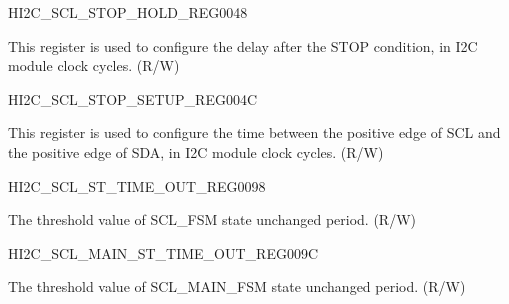 \begin{register}{H}{I2C\_SCL\_STOP\_HOLD\_REG}{\hexprefix{}0048}\label{regdesc:I2CSCLSTOPHOLDREG}
%
%
\regnewline%
\begin{regdesc}\begin{reglist}
\label{fielddesc:I2CSCLSTOPHOLDTIME}\item [I2C\_SCL\_STOP\_HOLD\_TIME] This register is used to configure the delay after the STOP condition, in I2C module clock cycles. (R/W)
\end{reglist}\end{regdesc}
\end{register}


\begin{register}{H}{I2C\_SCL\_STOP\_SETUP\_REG}{\hexprefix{}004C}\label{regdesc:I2CSCLSTOPSETUPREG}
%
%
\regnewline%
\begin{regdesc}\begin{reglist}
\label{fielddesc:I2CSCLSTOPSETUPTIME}\item [I2C\_SCL\_STOP\_SETUP\_TIME] This register is used to configure the time between the positive edge of SCL and the positive edge of SDA, in I2C module clock cycles. (R/W)
\end{reglist}\end{regdesc}
\end{register}


\begin{register}{H}{I2C\_SCL\_ST\_TIME\_OUT\_REG}{\hexprefix{}0098}\label{regdesc:I2CSCLSTTIMEOUTREG}
%
%
\regnewline%
\begin{regdesc}\begin{reglist}
\label{fielddesc:I2CSCLSTTO}\item [I2C\_SCL\_ST\_TO] The threshold value of SCL\_FSM state unchanged period. (R/W)
\end{reglist}\end{regdesc}
\end{register}


\begin{register}{H}{I2C\_SCL\_MAIN\_ST\_TIME\_OUT\_REG}{\hexprefix{}009C}\label{regdesc:I2CSCLMAINSTTIMEOUTREG}
%
%
\regnewline%
\begin{regdesc}\begin{reglist}
\label{fielddesc:I2CSCLMAINSTTO}\item [I2C\_SCL\_MAIN\_ST\_TO] The threshold value of SCL\_MAIN\_FSM state unchanged period. (R/W)
\end{reglist}\end{regdesc}
\end{register}


